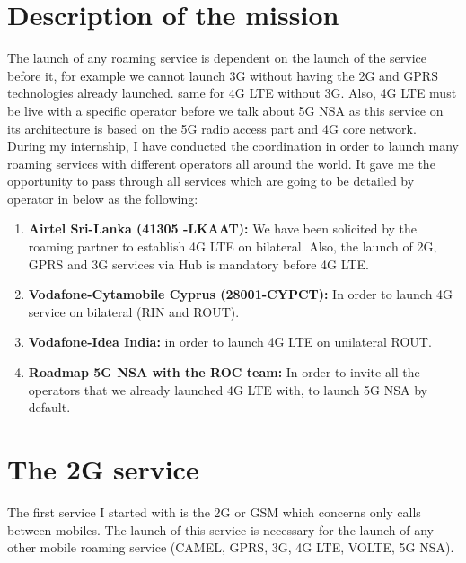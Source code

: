 \section{Description of the mission}

\-\hspace{0.5cm} The launch of any roaming service is dependent on the launch of the service before it, for example we cannot launch \acs{3G} without having the \acs{2G} and \acs{GPRS} technologies already launched. same for \acs{4G} \acs{LTE} without \acs{3G}. Also, \acs{4G} \acs{LTE} must be live with a specific operator before we talk about \acs{5G} \acs{NSA} as this service on its architecture is based on the \acs{5G} radio access part and \acs{4G} core network.\\

During my internship, I have conducted the coordination in order to launch many roaming services with different operators all around the world. It gave me the opportunity to pass through all services which are going to be detailed by operator in below as the following:
\begin{enumerate}
    \setlength\itemsep{0.1em}
    \item \textbf{Airtel Sri-Lanka (41305 -LKAAT):} We have been solicited by the roaming partner to establish \acs{4G} \acs{LTE} on bilateral. Also, the launch of \acs{2G}, \acs{GPRS} and \acs{3G} services via Hub is mandatory before \acs{4G} \acs{LTE}. 
    \item \textbf{Vodafone-Cytamobile Cyprus (28001-CYPCT):} In order to launch \acs{4G} service on bilateral (\acs{RIN} and \acs{ROUT}).
    \item \textbf{Vodafone-Idea India:} in order to launch \acs{4G} \acs{LTE} on unilateral \acs{ROUT}. 
    \item \textbf{Roadmap \acs{5G} \acs{NSA} with the \acs{ROC} team:} In order to invite all the operators that we already launched \acs{4G} \acs{LTE} with, to launch \acs{5G} \acs{NSA} by default. 
\end{enumerate}

\section{The \acs{2G} service}
\-\hspace{0.5cm} The first service I started with is the \acs{2G} or \acs{GSM} which concerns only calls between mobiles. The launch of this service is necessary for the launch of any other mobile roaming service (\acs{CAMEL}, \acs{GPRS}, \acs{3G}, \acs{4G} \acs{LTE}, \acs{VOLTE}, \acs{5G} \acs{NSA}).\\

